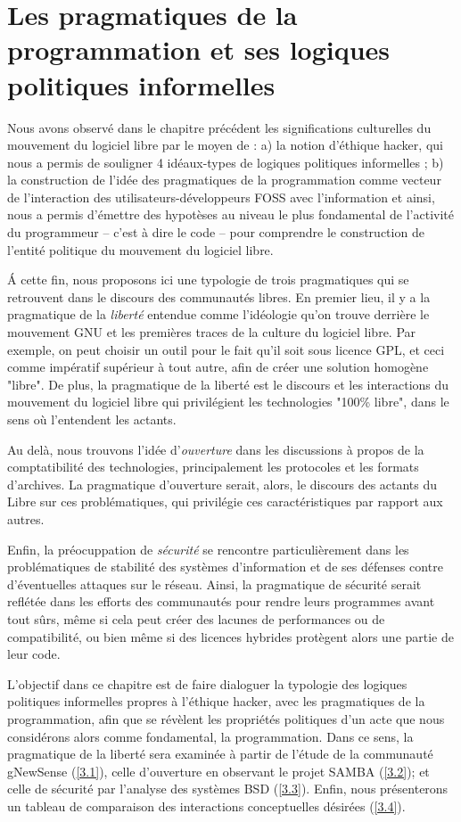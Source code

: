 \chapter{Les pragmatiques de la programmation et ses logiques politiques informelles} \label{3}

Nous avons observé dans le chapitre précédent les significations culturelles du mouvement du logiciel libre par le moyen de : a) la notion d'éthique hacker, qui nous a permis de souligner 4 idéaux-types de logiques politiques informelles ; b) la construction de l'idée des pragmatiques de la programmation comme vecteur de l'interaction des utilisateurs-développeurs FOSS avec l'information et ainsi, nous a permis d'émettre des hypotèses au niveau le plus fondamental de l'activité du programmeur -- c'est à dire le code -- pour comprendre le construction de l'entité politique du mouvement du logiciel libre.

\' A cette fin, nous proposons ici une typologie de trois pragmatiques qui se retrouvent dans le discours des communautés libres. En premier lieu, il y a la pragmatique de la \emph{liberté} entendue comme l'idéologie qu'on trouve derrière le mouvement GNU et les premières traces de la culture du logiciel libre. Par exemple, on peut choisir un outil pour le fait qu'il soit sous licence GPL, et ceci comme impératif supérieur à tout autre, afin de créer une solution homogène "libre". De plus, la pragmatique de la liberté est le discours et les interactions du mouvement du logiciel libre qui privilégient les technologies "100\% libre", dans le sens où l'entendent les actants.

Au delà, nous trouvons l'idée d'\emph{ouverture} dans les discussions à propos de la comptatibilité des technologies, principalement les protocoles et les formats d'archives. La pragmatique d'ouverture serait, alors, le discours des actants du Libre sur ces problématiques, qui privilégie ces caractéristiques par rapport aux autres.

Enfin, la préocuppation de \emph{sécurité} se rencontre particulièrement dans les problématiques de stabilité des systèmes d'information et de ses défenses contre d'éventuelles attaques sur le réseau.  Ainsi, la pragmatique de sécurité serait reflétée dans les efforts des communautés pour rendre leurs programmes avant tout sûrs, même si cela peut créer des lacunes de performances ou de compatibilité, ou bien même si des licences hybrides protègent alors une partie de leur code.

L'objectif dans ce chapitre est de faire dialoguer la typologie des logiques politiques informelles propres à l'éthique hacker, avec les pragmatiques de la programmation, afin que se révèlent les propriétés politiques d'un acte que nous considérons alors comme fondamental, la programmation. Dans ce sens, la pragmatique de la liberté sera examinée à partir de l'étude de la communauté gNewSense (\ref{3.1}), celle d'ouverture en observant le projet SAMBA (\ref{3.2}); et celle de sécurité par l'analyse des systèmes BSD (\ref{3.3}). Enfin, nous présenterons un tableau de comparaison des interactions conceptuelles désirées (\ref{3.4}).

